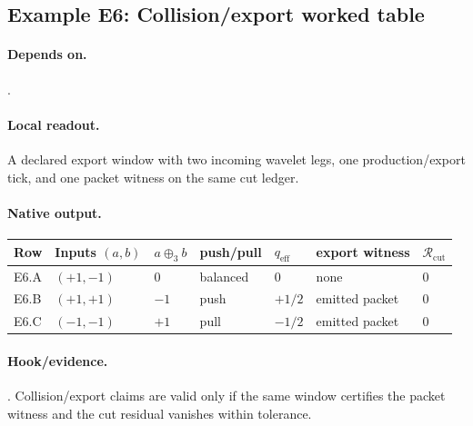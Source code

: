 \subsection{Example E6: Collision/export worked table}\label{ex:e6}
\paragraph{Depends on.} .
\paragraph{Local readout.} A declared export window with two incoming wavelet legs, one production/export tick, and one packet witness on the same cut ledger.
\paragraph{Native output.}
{\footnotesize
\begin{center}
\begin{tabular}{@{}lllllll@{}}
\toprule
Row & Inputs $(a,b)$ & $a\oplus_3 b$ & push/pull & $q_{\mathrm{eff}}$ & export witness & $\mathcal R_{\mathrm{cut}}$ \\
\midrule
E6.A & $(+1,-1)$ & $0$ & balanced & $0$ & none & $0$ \\
E6.B & $(+1,+1)$ & $-1$ & push & $+1/2$ & emitted packet & $0$ \\
E6.C & $(-1,-1)$ & $+1$ & pull & $-1/2$ & emitted packet & $0$ \\
\bottomrule
\end{tabular}
\end{center}}
\paragraph{Hook/evidence.} . Collision/export claims are valid only if the same window certifies the packet witness and the cut residual vanishes within tolerance.
